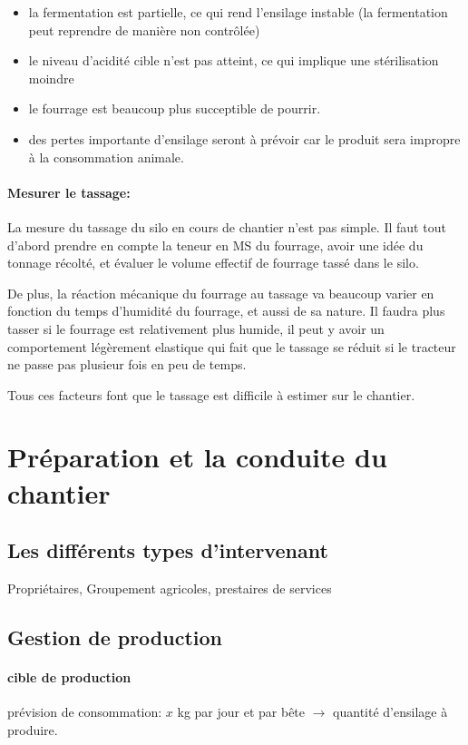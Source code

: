 \documentclass[12pt,a4paper]{report}
\begin{document}
\begin{itemize}
	\item la fermentation est partielle, ce qui rend l'ensilage instable (la fermentation peut reprendre de manière non contrôlée)
	\item le niveau d'acidité cible n'est pas atteint, ce qui implique une stérilisation moindre
	\item le fourrage est beaucoup plus succeptible de pourrir.
	\item des pertes importante d'ensilage seront à prévoir car le produit sera impropre à la consommation animale.
\end{itemize}

\paragraph{Mesurer le tassage:} La mesure du tassage du silo en cours de chantier n'est pas simple. Il faut tout d'abord prendre en compte la teneur en MS du fourrage, avoir une idée du tonnage récolté, et évaluer le volume effectif de fourrage tassé dans le silo.
\newline

De plus, la réaction mécanique du fourrage au tassage va beaucoup varier en fonction du temps d'humidité du fourrage, et aussi de sa nature. Il faudra plus tasser si le fourrage est relativement plus humide, il peut y avoir un comportement légèrement elastique qui fait que le tassage se réduit si le tracteur ne passe pas plusieur fois en peu de temps. 

Tous ces facteurs font que le tassage est difficile à estimer sur le chantier.

\section{Préparation et la conduite du chantier}

\subsection{Les différents types d'intervenant}
Propriétaires, Groupement agricoles, prestaires de services

\subsection{Gestion de production}
\paragraph{cible de production} prévision de consommation: $x$ kg par jour et par bête $\rightarrow$ quantité d'ensilage à produire.
\end{document}

